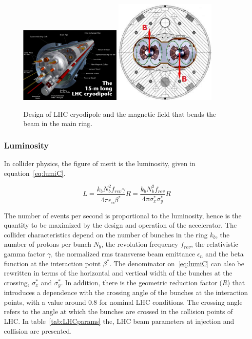 \begin{figure}[!Hhtbp]
  \begin{center}
    \includegraphics[width=0.45\textwidth]{figs/cryodipole.jpg}
    \includegraphics[width=0.45\textwidth]{figs/dipole_B.jpg}
    \caption{Design of LHC cryodipole and the magnetic field that bends the beam in the main ring.}
    \label{fig:dipole}
  \end{center}
\end{figure}

\subsubsection{Luminosity}
\label{sec:lumi}

In collider physics, the figure of merit is the luminosity, given in equation~\ref{eq:lumiC}. 

\begin{equation}
  \label{eq:lumiC}
  L=\frac{k_{b}N_{b}^{2}f_{rev}\gamma}{4\pi\epsilon_{n}\beta^{*}}R=\frac{k_{b}N_{b}^{2}f_{rev}}{4\pi\sigma^{*}_{x}\sigma^{*}_{y}}R
\end{equation}

The number of events per second is proportional to the luminosity, hence is the quantity to be maximized by the design and operation of the accelerator. The collider characteristics depend on the number of bunches in the ring $k_{b}$, the number of protons per bunch $N_{b}$, the revolution frequency $f_{rev}$, the relativistic gamma factor $\gamma$, the normalized rms transverse beam emittance $\epsilon_{n}$ and the beta function at the interaction point $\beta^{*}$. The denominator on~\ref{eq:lumiC} can also be rewritten in terms of the horizontal and vertical width of the bunches at the crossing, $\sigma^{*}_{x}$ and $\sigma^{*}_{y}$. In addition, there is the geometric reduction factor ($R$) that introduces a dependence with the crossing angle of the bunches at the interaction points, with a value around 0.8 for nominal LHC conditions. The crossing angle refers to the angle at which the bunches are crossed in the collision points of LHC. In table~\ref{tab:LHCparams} the, LHC beam parameters at injection and collision are presented.  

